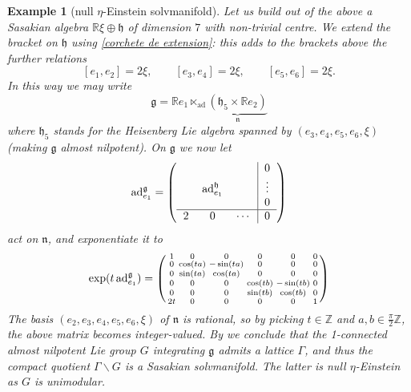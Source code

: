 \documentclass[12pt, twoside]{amsart}
\def\g{\mathfrak{g}}
\def\h{\mathfrak{h}}
\def\n{\mathfrak{n}}
\def\R{\mathbb{R}}
\def\Z{\mathbb{Z}}
\def\ad{\operatorname{ad}}
\newcommand{\op}[1]{\operatorname{#1}}
\newenvironment{spmatrix}{\left(\smallmatrix}{\endsmallmatrix\right)}
\newtheorem{example}[definition]{\bf Example}
\theoremstyle{definition}
\begin{document}
\begin{example}[null $\eta$-Einstein solvmanifold]
{Let us build out of the above a Sasakian algebra $\R \xi \oplus \h$ of dimension $7$ with non-trivial centre. We extend the bracket on $\h$ using \eqref{corchete de extension}: this adds to the brackets above the further relations
$$[e_1,e_2]=2\xi,\qquad [e_3,e_4]=2\xi,\qquad [e_5,e_6]=2\xi.$$
In this way we may write 
$$\g=\R e_1 \ltimes_{\ad} \underbrace{(\h_{5}\times \R e_2)}_{\n}$$ 
where $\h_5$ stands for the Heisenberg Lie algebra spanned by $(e_3,e_4,e_5,e_6,\xi)$ (making $\g$ almost nilpotent). 
On $\g$ we now let
\begin{equation*}
    \ad_{e_1}^\g=
    \left(\begin{tabular}{c c c | c }
         & & & $0$\\ 
         & $\ad_{e_1}^\h$ & & $\vdots$\\
         & & & $0$\\  \hline
        $2$ & $0$ & $\cdots$ & $0$
\end{tabular}\right)
\end{equation*}
act on $\n$, and exponentiate it to 
\begin{equation*}
    \op{exp}(t\ad_{e_1}^\g)=
    \begin{spmatrix}
        1&0&0&0&0&0\\
        0&\cos(ta)&-\sin(ta)&0&0&0\\
        0&\sin(ta)&\cos(ta)&0&0&0\\
        0&0&0&\cos(tb)&-\sin(tb)&0\\
        0&0&0&\sin(tb)&\cos(tb)&0\\
        2t&0&0&0&0&1
    \end{spmatrix}
\end{equation*}
The basis $(e_2,e_3,e_4,e_5,e_6,\xi)$ of $\n$ is rational, so by picking 
$t\in\Z$ and $a, b\in\frac{\pi}{2}\Z$, the above matrix becomes integer-valued.
By \cite[Lemma 2.9]{Anna} we conclude that the 1-connected almost nilpotent Lie group $G$ integrating $\g$ admits a lattice $\Gamma$, and thus the compact quotient $\Gamma \backslash G$ is a Sasakian solvmanifold. The latter is null $\eta$-Einstein as $G$ is unimodular.} \par
{}
\end{example}
\end{document}
